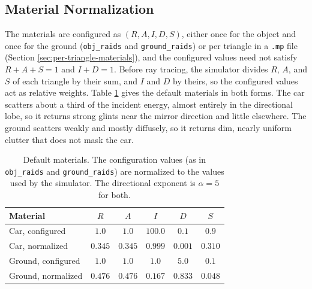 \documentclass[sensors,article,submit,moreauthors]{Definitions/mdpi}
\begin{document}
\subsection{Material Normalization}
\label{app:materials}
The materials are configured as $(R,A,I,D,S)$, either once for the object and
once for the ground
(\texttt{obj\_raids} and \texttt{ground\_raids}) or per triangle in a
\texttt{.mp} file (Section
\ref{sec:per-triangle-materials}), and the configured values need not satisfy
$R+A+S=1$ and $I+D=1$.
Before ray tracing, the simulator divides $R$, $A$, and $S$ of each triangle by
their sum, and $I$
and $D$ by theirs, so the configured values act as relative weights. Table
\ref{tab:materials}
gives the default materials in both forms. The car scatters about a third of the
incident energy,
almost entirely in the directional lobe, so it returns strong glints near the
mirror direction and
little elsewhere. The ground scatters weakly and mostly diffusely, so it returns
dim, nearly
uniform clutter that does not mask the car.
\begin{table}[H]
\centering
\caption{Default materials. The configuration values (as in \texttt{obj\_raids}
and
\texttt{ground\_raids}) are normalized to the values used by the simulator. The
directional
exponent is $\alpha = 5$ for both.}
\label{tab:materials}
\begin{tabular}{lccccc}
\toprule
\textbf{Material} & \textbf{$R$} & \textbf{$A$} & \textbf{$I$} & \textbf{$D$} &
\textbf{$S$} \\
\midrule
Car, configured    & $1.0$   & $1.0$   & $100.0$ & $0.1$ & $0.9$ \\
Car, normalized    & $0.345$ & $0.345$ & $0.999$ & $0.001$ & $0.310$ \\
Ground, configured & $1.0$   & $1.0$   & $1.0$   & $5.0$ & $0.1$ \\
Ground, normalized & $0.476$ & $0.476$ & $0.167$ & $0.833$ & $0.048$ \\
\bottomrule
\end{tabular}
\end{table}
\end{document}
